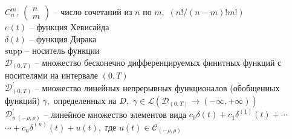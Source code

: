 \noindent $C_n^m, \, \left(\begin{array}{c} n\\m\end{array}
	\right)$ -- число сочетаний из $n$   по $m,$ $({n!}/{(n-m)! m!})$\\

\noindent $e(t)$ -- функция  Хевисайда\\

\noindent $\delta(t)$ -- функция Дирака\\

\noindent $\text{supp}$  -- носитель функции\\

\noindent ${\mathcal{D}}_{(0,T)}$ -- множество бесконечно дифференцируемых финитных функций с носителями  на интервале $(0,T)$\\

\noindent ${\mathcal{D}}_{\left(0,T\right)}^{'} $ -- множество линейных непрерывных функционалов (обобщенных функций) $\gamma,$ определенных на $D,$ $\gamma \in \mathcal{L}({\mathcal{D}}_{\left(0,T\right)} \mathop{\to }\limits^{} (-\infty ,+\infty ))$ \\

\noindent ${\mathcal{D}}_{n\, (-\rho,\rho)}^{\prime}$ -- линейное множество  элементов вида $c_0\delta(t) + c_1\delta^{(1)}(t) + \cdots$\\ $\cdots + c_n\delta^{(n)}(t) + u(t), $
где $u(t) \in \mathcal{C}_{(-\rho, \rho)}$

%


